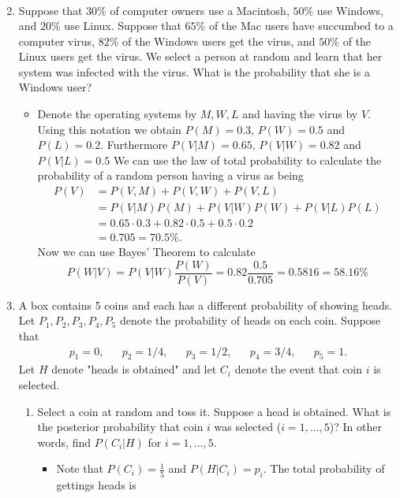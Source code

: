 \documentclass{article}
\begin{document}
\begin{enumerate}
\begin{itemize}
$$\begin{aligned}
			\end{aligned}
			$$
		\end{itemize}
	\item Suppose that $30\%$ of computer owners use a Macintosh, $50\%$ use Windows, and $20\%$ use Linux. Suppose that $65\%$ of the Mac users have succumbed to a computer virus, $82\%$ of the Windows users get the virus, and $50\%$ of the Linux users get the virus. We select a person at random and learn that her system was infected with the virus. What is the probability that she is a Windows user?
		\begin{itemize}
			\item Denote the operating systems by $M, W, L$ and having the virus by $V$. Using this notation we obtain $P(M) = 0.3$, $P(W) = 0.5$ and $P(L) = 0.2$. Furthermore $P(V|M) = 0.65$, $P(V|W) = 0.82$ and $P(V|L) = 0.5$ We can use the law of total probability to calculate the probability of a random person having a virus as being
			$$
			\begin{aligned}
			P(V) &= P(V, M) + P(V, W) + P(V, L) \\
			&= P(V|M)P(M) + P(V|W)P(W) + P(V|L)P(L) \\
			&= 0.65 \cdot 0.3 + 0.82 \cdot 0.5 + 0.5 \cdot 0.2 \\
			&= 0.705 = 70.5\%.
			\end{aligned}
			$$
			Now we can use Bayes' Theorem to calculate
			$$
			P(W|V) = P(V|W) \frac{P(W)}{P(V)} = 0.82 \frac{0.5}{0.705} = 0.5816 = 58.16\%
			$$
		\end{itemize}
	\item A box contains 5 coins and each has a different probability of showing heads. Let $P_1, P_2, P_3, P_4, P_5$ denote the probability of heads on each coin. Suppose that
	$$
	\begin{aligned}
	p_1 = 0,&& p_2 = 1/4,&& p_3 = 1/2,&& p_4 = 3/4,&& p_5 = 1.
	\end{aligned}
	$$
	Let $H$ denote "heads is obtained" and let $C_i$ denote the event that coin $i$ is selected.
	\begin{enumerate}
		\item Select a coin at random and toss it. Suppose a head is obtained. What is the posterior probability that coin $i$ was selected ($i = 1, ..., 5$)? In other words, find $P(C_i|H)$ for $i = 1, ..., 5$.
			\begin{itemize}
				\item Note that $P(C_i) = \frac{1}{5}$ and $P(H|C_i) = p_i$. The total probability of gettings heads is

\end{itemize}
\end{enumerate}
\end{enumerate}
\end{document}
